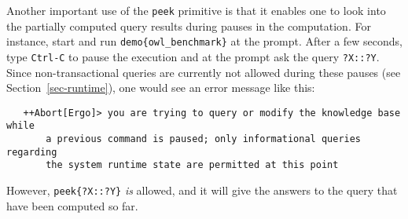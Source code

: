 Another important use of the \texttt{peek} primitive is that it enables one
to look into the partially computed query results during pauses in the
computation. For instance, start \ERGO and run
\texttt{demo\{owl\_benchmark\}} at the prompt. After a few seconds, type
\texttt{Ctrl-C} to pause the execution and at the prompt ask the query
\texttt{?X::?Y}. Since non-transactional queries are currently
not allowed during these pauses (see Section~\ref{sec-runtime}),
one would see an error message like this:
\begin{verbatim}
   ++Abort[Ergo]> you are trying to query or modify the knowledge base while
	   a previous command is paused; only informational queries regarding
	   the system runtime state are permitted at this point
\end{verbatim}
However, \texttt{peek\{?X::?Y\}} \emph{is} allowed, and it will give
the answers to the query that have been computed so far.


